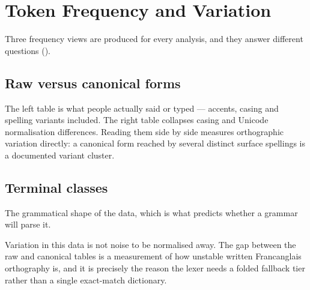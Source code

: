 \section{Token Frequency and Variation}\label{sec:frequency}

Three frequency views are produced for every analysis, and they answer different
questions ().

\subsection{Raw versus canonical forms}

The left table is what people actually said or typed --- accents, casing and spelling
variants included. The right table collapses casing and Unicode normalisation differences.
Reading them side by side measures orthographic variation directly: a canonical form
reached by several distinct surface spellings is a documented variant cluster.

\begin{center}
\begin{minipage}[t]{0.47\linewidth}
\centering
\end{minipage}\hfill
\begin{minipage}[t]{0.47\linewidth}
\centering
\end{minipage}
\end{center}

\subsection{Terminal classes}

The grammatical shape of the data, which is what predicts whether a grammar will parse it.

\begin{center}\end{center}

\begin{keypoint}
Variation in this data is not noise to be normalised away. The gap between the raw and
canonical tables is a measurement of how unstable written Francanglais orthography is,
and it is precisely the reason the lexer needs a folded fallback tier rather than a single
exact-match dictionary.
\end{keypoint}

